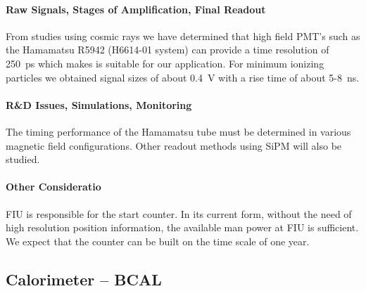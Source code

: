 \documentclass[11pt]{article}
\begin{document}
\paragraph{Raw Signals, Stages of Amplification, Final Readout}
From studies using cosmic rays we have determined that high field
PMT's such as the Hamamatsu R5942 (H6614-01 system) can provide a time
resolution of 250~ps which makes is suitable for our application. For
minimum ionizing particles we obtained signal sizes of about 0.4~V
with a rise time of about 5-8~ns.

\paragraph{R\&D Issues, Simulations, Monitoring}
The timing performance of the Hamamatsu tube must be determined in
various magnetic field configurations. Other readout methods using
SiPM will also be studied.

\paragraph{Other Consideratio}
FIU is responsible for the start counter. In its current form, without
the need of high resolution position information, the available man
power at FIU is sufficient.
We expect that the counter can be built on the time scale of one year.

\subsection{Calorimeter -- BCAL}
\end{document}
